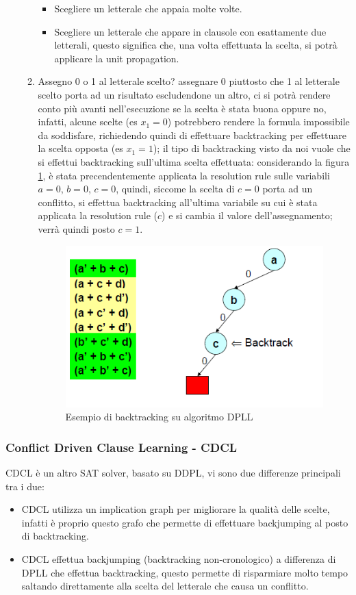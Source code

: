 \documentclass[12pt,a4paper]{article}
\begin{document}
\begin{enumerate}
\begin{enumerate}
\begin{itemize}
\item Scegliere un letterale che appaia molte volte.
\item Scegliere un letterale che appare in clausole con esattamente due letterali, questo significa che, una volta effettuata la scelta, si potrà applicare la unit propagation.
\end{itemize}
\item Assegno 0 o 1 al letterale scelto? assegnare 0 piuttosto che 1 al letterale scelto porta ad un risultato escludendone un altro, ci si potrà rendere conto più avanti nell'esecuzione se la scelta è stata buona oppure no, infatti, alcune scelte (es $x_1 = 0$) potrebbero rendere la formula impossibile da soddisfare, richiedendo quindi di effettuare backtracking per effettuare la scelta opposta (es $x_1 = 1$); il tipo di backtracking visto da noi vuole che si effettui backtracking sull'ultima scelta effettuata: considerando la figura \ref{fig:9}, è stata precendentemente applicata la resolution rule sulle variabili $a = 0$, $b = 0$, $c = 0$, quindi, siccome la scelta di $c = 0$ porta ad un conflitto, si effettua backtracking all'ultima variabile su cui è stata applicata la resolution rule ($c$) e si cambia il valore dell'assegnamento; verrà quindi posto $c = 1$.
\begin{figure}[h]
	\centering
	\includegraphics[width=0.8\linewidth]{img/Dpll_backtrack.png}
	\caption{Esempio di backtracking su algoritmo DPLL}
	\label{fig:9}
\end{figure}
\end{enumerate}
\end{enumerate}

\subsubsection{Conflict Driven Clause Learning - CDCL}
CDCL è un altro SAT solver, basato su DDPL, vi sono due differenze principali tra i due:
\begin{itemize}
\item CDCL utilizza un implication graph per migliorare la qualità delle scelte, infatti è proprio questo grafo che permette di effettuare backjumping al posto di backtracking.
\item CDCL effettua backjumping (backtracking non-cronologico) a differenza di DPLL che effettua backtracking, questo permette di risparmiare molto tempo saltando direttamente alla scelta del letterale che causa un conflitto.
\end{itemize}
\end{document}
